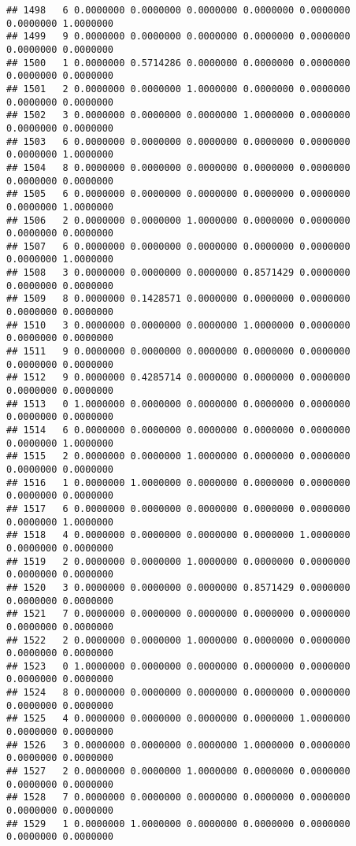 \documentclass[
]{article}
\begin{document}
\begin{verbatim}
## 1498   6 0.0000000 0.0000000 0.0000000 0.0000000 0.0000000 0.0000000 1.0000000
## 1499   9 0.0000000 0.0000000 0.0000000 0.0000000 0.0000000 0.0000000 0.0000000
## 1500   1 0.0000000 0.5714286 0.0000000 0.0000000 0.0000000 0.0000000 0.0000000
## 1501   2 0.0000000 0.0000000 1.0000000 0.0000000 0.0000000 0.0000000 0.0000000
## 1502   3 0.0000000 0.0000000 0.0000000 1.0000000 0.0000000 0.0000000 0.0000000
## 1503   6 0.0000000 0.0000000 0.0000000 0.0000000 0.0000000 0.0000000 1.0000000
## 1504   8 0.0000000 0.0000000 0.0000000 0.0000000 0.0000000 0.0000000 0.0000000
## 1505   6 0.0000000 0.0000000 0.0000000 0.0000000 0.0000000 0.0000000 1.0000000
## 1506   2 0.0000000 0.0000000 1.0000000 0.0000000 0.0000000 0.0000000 0.0000000
## 1507   6 0.0000000 0.0000000 0.0000000 0.0000000 0.0000000 0.0000000 1.0000000
## 1508   3 0.0000000 0.0000000 0.0000000 0.8571429 0.0000000 0.0000000 0.0000000
## 1509   8 0.0000000 0.1428571 0.0000000 0.0000000 0.0000000 0.0000000 0.0000000
## 1510   3 0.0000000 0.0000000 0.0000000 1.0000000 0.0000000 0.0000000 0.0000000
## 1511   9 0.0000000 0.0000000 0.0000000 0.0000000 0.0000000 0.0000000 0.0000000
## 1512   9 0.0000000 0.4285714 0.0000000 0.0000000 0.0000000 0.0000000 0.0000000
## 1513   0 1.0000000 0.0000000 0.0000000 0.0000000 0.0000000 0.0000000 0.0000000
## 1514   6 0.0000000 0.0000000 0.0000000 0.0000000 0.0000000 0.0000000 1.0000000
## 1515   2 0.0000000 0.0000000 1.0000000 0.0000000 0.0000000 0.0000000 0.0000000
## 1516   1 0.0000000 1.0000000 0.0000000 0.0000000 0.0000000 0.0000000 0.0000000
## 1517   6 0.0000000 0.0000000 0.0000000 0.0000000 0.0000000 0.0000000 1.0000000
## 1518   4 0.0000000 0.0000000 0.0000000 0.0000000 1.0000000 0.0000000 0.0000000
## 1519   2 0.0000000 0.0000000 1.0000000 0.0000000 0.0000000 0.0000000 0.0000000
## 1520   3 0.0000000 0.0000000 0.0000000 0.8571429 0.0000000 0.0000000 0.0000000
## 1521   7 0.0000000 0.0000000 0.0000000 0.0000000 0.0000000 0.0000000 0.0000000
## 1522   2 0.0000000 0.0000000 1.0000000 0.0000000 0.0000000 0.0000000 0.0000000
## 1523   0 1.0000000 0.0000000 0.0000000 0.0000000 0.0000000 0.0000000 0.0000000
## 1524   8 0.0000000 0.0000000 0.0000000 0.0000000 0.0000000 0.0000000 0.0000000
## 1525   4 0.0000000 0.0000000 0.0000000 0.0000000 1.0000000 0.0000000 0.0000000
## 1526   3 0.0000000 0.0000000 0.0000000 1.0000000 0.0000000 0.0000000 0.0000000
## 1527   2 0.0000000 0.0000000 1.0000000 0.0000000 0.0000000 0.0000000 0.0000000
## 1528   7 0.0000000 0.0000000 0.0000000 0.0000000 0.0000000 0.0000000 0.0000000
## 1529   1 0.0000000 1.0000000 0.0000000 0.0000000 0.0000000 0.0000000 0.0000000

\end{verbatim}
\end{document}
